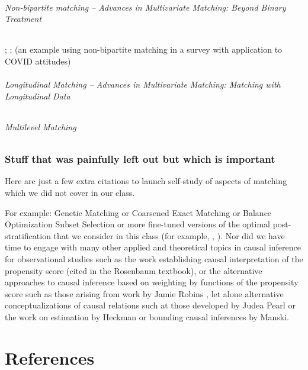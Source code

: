 \documentclass[10pt,letterpaper]{article}
\begin{document}
\paragraph{Non-bipartite matching -- Advances in Multivariate Matching: Beyond Binary Treatment }
; ;  (an example using non-bipartite matching in a survey with application to COVID attitudes)

\paragraph{Longitudinal Matching -- Advances in Multivariate Matching: Matching with Longitudinal Data}


\paragraph{Multilevel Matching}



\section{Stuff that was painfully left out but which is important}

Here are just a few extra citations to launch self-study of aspects of
matching which we did not cover in our class.

For example: Genetic Matching \cite{diamond2013genetic, sekhon2007multivariate} or
Coarsened Exact Matching \cite{iacus2009causal,
  iacus2011multivariate} or Balance Optimization Subset Selection
\cite{nikolaevetal:12} or more fine-tuned versions of the optimal
post-stratification that we consider in this class (for example,
\cite{zubizarreta2012using}, \cite{savje2021generalized}). Nor did we have time to engage with
many other applied and theoretical topics in causal inference for
observational studies such as the work establishing causal
interpretation of the propensity score (cited in the Rosenbaum
textbook), or the alternative approaches to causal inference based on
weighting by functions of the propensity score such as those arising
from work by Jamie Robins \cite{glynn2010introduction}, let alone
alternative conceptualizations of causal relations such at those
developed by Judea Pearl \cite{judeapearl2000a} or the work on
estimation by Heckman or bounding causal inferences by Manski.


\part{References}

\printbibliography[title=References]
\end{document}
